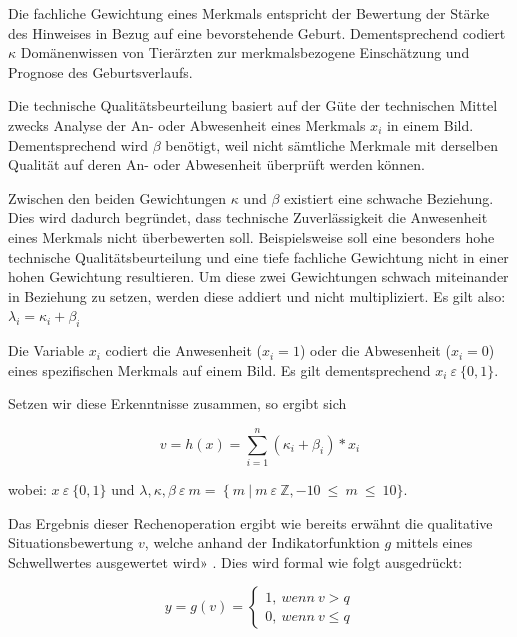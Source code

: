 Die fachliche Gewichtung eines Merkmals entspricht der Bewertung  der Stärke des Hinweises in Bezug auf eine bevorstehende Geburt. Dementsprechend codiert $\kappa$ Domänenwissen von Tierärzten zur merkmalsbezogene Einschätzung und Prognose des Geburtsverlaufs.

Die technische Qualitätsbeurteilung basiert auf der Güte der technischen Mittel zwecks Analyse der An- oder Abwesenheit eines Merkmals $x_{i}$ in einem Bild. Dementsprechend wird $\beta$ benötigt, weil nicht sämtliche Merkmale mit derselben Qualität auf deren An- oder Abwesenheit überprüft werden können.

Zwischen den beiden Gewichtungen $\kappa$ und $\beta$ existiert eine schwache Beziehung. Dies wird dadurch begründet, dass technische Zuverlässigkeit die Anwesenheit eines Merkmals nicht überbewerten soll. Beispielsweise soll eine besonders hohe technische Qualitätsbeurteilung und eine tiefe fachliche Gewichtung nicht in einer hohen Gewichtung resultieren. Um diese zwei Gewichtungen schwach miteinander in Beziehung zu setzen, werden diese addiert und nicht multipliziert. Es gilt also: $\lambda_{i} = \kappa_{i} + \beta_{i}$

Die Variable  $x_{i}$ codiert die Anwesenheit ($x_{i}=1$) oder die Abwesenheit ($x_{i}=0$) eines spezifischen Merkmals auf einem Bild. Es gilt dementsprechend  $ x_{i} \:  \varepsilon \: \{0,1\}. $ 


Setzen wir diese Erkenntnisse zusammen, so ergibt sich

\begin{equation}\label{Vollständige Linerarkombination zur Geburtsprognose}
v = h(x) = \sum_{i=1}^n (\kappa_{i}+\beta_{i}) *x_{i}
\end{equation}

wobei:  $ x \:  \varepsilon \: \{0,1\} $ und $ \lambda, \kappa, \beta   \: \varepsilon \: m =\: \{ \:  m \: | \:  m \:  \varepsilon \:  \mathbb{Z}, -10 \:  \leq \: m \: \leq \:  10\} $.

Das Ergebnis dieser Rechenoperation ergibt wie bereits erwähnt die qualitative Situationsbewertung $v$, welche anhand der Indikatorfunktion $g$ mittels eines Schwellwertes ausgewertet wird» . Dies wird formal wie folgt ausgedrückt:

\begin{equation}\label{Vollständige Linerarkombination zur Geburtsprognose: Schwellwertanalyse}
y = g(v) =\begin{cases}
			1,\: wenn \: v > q\\
			0,\: wenn \: v \leq q
\end{cases}
\end{equation}

